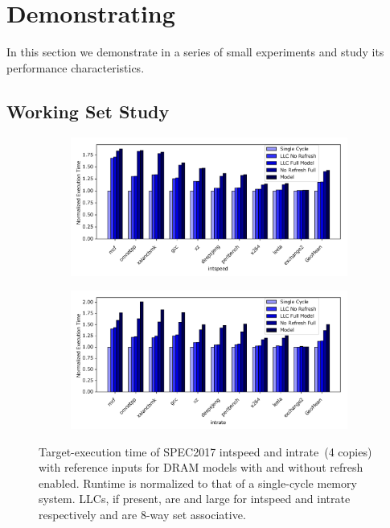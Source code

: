 \section{Demonstrating \PNAME}\label{sec:evaluation}
In this section we demonstrate \PNAME in a series of small experiments and
study its performance characteristics.

\vspace{-0.05in}
\subsection{Working Set Study}

\begin{figure}[t]
    \vspace{-0.15in}
    \centering
    \begin{subfigure}[t]{0.49\textwidth}
        \includegraphics[width=\columnwidth]{figures/dram_fidelity_speed_slowdown.pdf}
    \end{subfigure}
    \begin{subfigure}[t]{0.49\textwidth}
        \includegraphics[width=\columnwidth]{figures/dram_fidelity_rate_slowdown.pdf}
    \end{subfigure}
    \vspace{-0.20in}
    \caption{Target-execution time of SPEC2017 intspeed and intrate~(4 copies)
    with reference inputs for DRAM models with and without refresh enabled.
    Runtime is normalized to that of a single-cycle memory system. LLCs, if
    present, are  and  large for intspeed and
    intrate respectively and are 8-way set associative.}
    \label{fig:model-fidelity-sweep}
    \vspace{-0.10in}
\end{figure}
